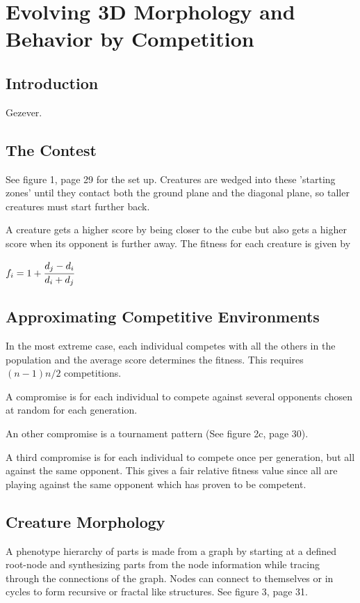 \documentclass[12pt]{book}
\begin{document}
\chapter{Evolving 3D Morphology and Behavior by Competition}
\section{Introduction}
Gezever.

\section{The Contest}
See figure 1, page 29 for the set up. Creatures are wedged into these 'starting zones' until they contact both the ground plane and the diagonal plane, so taller creatures must start further back.

A creature gets a higher score by being closer to the cube but also gets a higher score when its opponent is further away. The fitness for each creature is given by
\begin{center}
$f_i = 1 + \cfrac{d_j - d_i}{d_i + d_j}$
\end{center}

\section{Approximating Competitive Environments}
In the most extreme case, each individual competes with all the others in the population and the average score determines the fitness. This requires $(n-1)n/2$ competitions.

A compromise is for each individual to compete against several opponents chosen at random for each generation.

An other compromise is a tournament pattern (See figure 2c, page 30).

A third compromise is for each individual to compete once per generation, but all against the same opponent. This gives a fair relative fitness value since all are playing against the same opponent which has proven to be competent.

\section{Creature Morphology}
A phenotype hierarchy of parts is made from a graph by starting at a defined root-node and synthesizing parts from the node information while tracing through the connections of the graph. Nodes can connect to themselves or in cycles to form recursive or fractal like structures. See figure 3, page 31.
\end{document}
